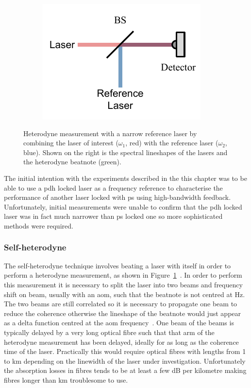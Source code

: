 \begin{figure}
    \begin{subfigure}{0.49\linewidth}
    \includegraphics{part1/Figs/HeterodyneReferenceLaser.pdf}
    \end{subfigure}
    \begin{subfigure}{0.49\linewidth}
    
    \end{subfigure}
    \caption{Heterodyne measurement with a narrow reference laser by combining the laser of interest ($\omega_1$, red) with the reference laser ($\omega_2$, blue). Shown on the right is the spectral lineshapes of the lasers and the heterodyne beatnote (green).}
    \label{figure:heterodyne_reference}
\end{figure}

The initial intention with the experiments described in the this chapter was to be able to use a \gls{pdh} locked laser as a frequency reference to characterise the performance of another laser locked with \gls{ps} using high-bandwidth feedback.
Unfortunately, initial measurements were unable to confirm that the \gls{pdh} locked laser was in fact much narrower than \gls{ps} locked one so more sophisticated methods were required.

\subsubsection{Self-heterodyne}

The self-heterodyne technique involves beating a laser with itself in order to perform a heterodyne measurement, as shown in Figure~\ref{figure:heterodyne_reference}~\cite{okoshi_novel_1980}.
In order to perform this measurement it is necessary to split the laser into two beams and frequency shift on beam, usually with an \gls{aom}, such that the beatnote is not centred at \unit[0]{Hz}.
The two beams are still correlated so it is necessary to propagate one beam to reduce the coherence otherwise the lineshape of the beatnote would just appear as a delta function centred at the \gls{aom} frequency~\cite{richter_linewidth_1986}.
One beam of the beams is typically delayed by a very long optical fibre such that that arm of the heterodyne measurement has been delayed, ideally for as long as the coherence time of the laser.
Practically this would require optical fibres with lengths from 1 to \unit[100]{km} depending on the linewidth of the laser under investigation.
Unfortunately the absorption losses in fibres tends to be at least a few dB per kilometre making fibres longer than \unit[10]{km} troublesome to use.


